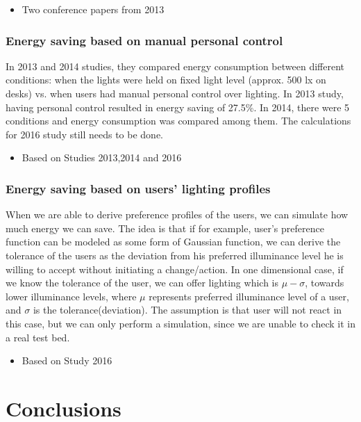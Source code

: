 \documentclass[a4paper]{article}
\begin{document}
\begin{itemize}
	\item{\color{gray}Two conference papers from 2013}
\end{itemize}

\subsubsection{\color{gray}Energy saving based on manual personal control}

In 2013 and 2014 studies, they compared energy consumption between different conditions: when the lights were held on fixed light level (approx. 500 lx on desks) vs. when users had manual personal control over lighting. In 2013 study, having personal control resulted in energy saving of 27.5\%. In 2014, there were 5 conditions and energy consumption was compared among them. The calculations for 2016 study still needs to be done.

\begin{itemize}
	\item{\color{gray}Based on Studies 2013,2014 and 2016}
\end{itemize}

\subsubsection{\color{gray}Energy saving based on users' lighting profiles}

When we are able to derive preference profiles of the users, we can simulate how much energy we can save. The idea is that if for example, user's preference function can be modeled as some form of Gaussian function, we can derive the tolerance of the users as the deviation from his preferred illuminance level he is willing to accept without initiating a change/action. In one dimensional case, if we know the tolerance of the user, we can offer lighting which is $\mu - \sigma$, towards lower illuminance levels, where $\mu$ represents preferred illuminance level of a user, and $\sigma$ is the tolerance(deviation). The assumption is that user will not react in this case, but we can only perform a simulation, since we are unable to check it in a real test bed. 



\begin{itemize}
	\item{\color{gray}Based on Study 2016}
\end{itemize}


\section{Conclusions}
\end{document}
